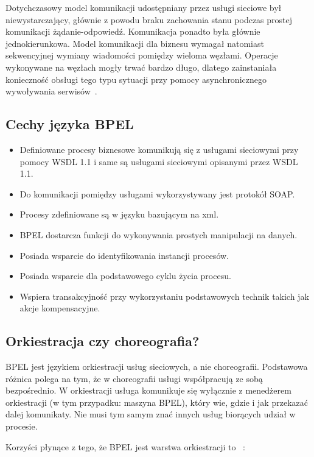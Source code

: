 Dotychczasowy model komunikacji udostępniany przez usługi sieciowe był niewystarczający, głównie z powodu braku zachowania stanu podczas prostej komunikacji żądanie-odpowiedź.  Komunikacja ponadto była głównie jednokierunkowa. Model komunikacji dla biznesu wymagał natomiast sekwencyjnej wymiany wiadomości pomiędzy wieloma węzłami. Operacje wykonywane na węzłach mogły trwać bardzo długo, dlatego zainstaniała konieczność obsługi tego typu sytuacji przy pomocy asynchronicznego wywoływania serwisów~\cite{OASISBPELSpec}.

\subsection{Cechy języka BPEL}
\label{sec:bpelFeatures}

\begin{itemize}
\item Definiowane procesy biznesowe komunikują się z usługami sieciowymi przy pomocy WSDL 1.1 i same są usługami sieciowymi opisanymi przez WSDL 1.1.  
\item Do komunikacji pomiędzy usługami wykorzystywany jest protokół SOAP.
\item Procesy zdefiniowane są w języku bazującym na xml.
\item BPEL dostarcza funkcji do wykonywania prostych manipulacji na danych.
\item Posiada wsparcie do identyfikowania instancji procesów.
\item Posiada wsparcie dla podstawowego cyklu życia procesu.
\item Wspiera transakcyjność przy wykorzystaniu podstawowych technik takich jak akcje kompensacyjne.
\end{itemize}

\subsection{Orkiestracja czy choreografia?}
\label{sec:bpelOrchestration}
BPEL jest językiem orkiestracji usług sieciowych, a nie choreografii. Podstawowa różnica polega na tym, że w choreografii usługi współpracują ze sobą bezpośrednio. W orkiestracji usługa komunikuje się wyłącznie z menedżerem orkiestracji (w tym przypadku: maszyna BPEL), który wie, gdzie i jak przekazać dalej komunikaty. Nie musi tym samym znać innych usług biorących udział w procesie. 

Korzyści płynące z tego, że BPEL jest warstwa orkiestracji to ~\cite{wiao}:

